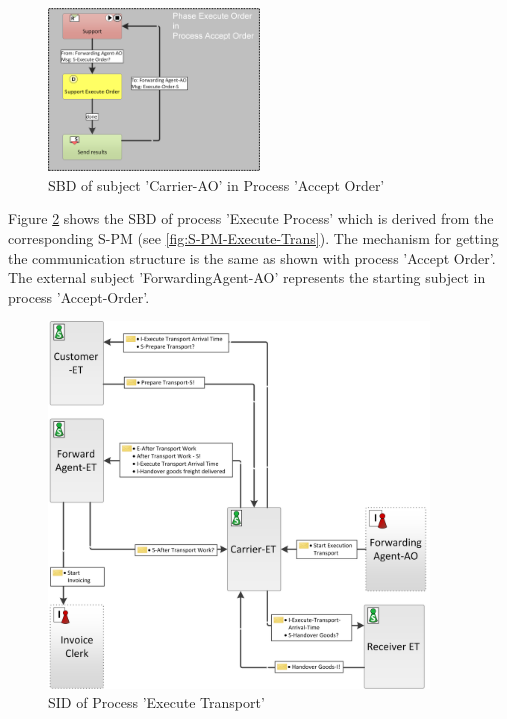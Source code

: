 \begin{figure}[hbtp]
    \begin{center}
        
	\includegraphics[width=0.5\textwidth]{Figures/Chapter5/Subject-Phase/CarrierAO_NEW.png}
	\caption{SBD of subject 'Carrier-AO' in Process 'Accept Order'}
	\label{fig:CarrierAO}
\end{center}
\end{figure}

Figure \ref{fig:SCD-ExecuteTransport} shows the SBD of process 'Execute Process' which is derived from the corresponding S-PM (see \ref{fig:S-PM-Execute-Trans}). The mechanism for getting the communication structure is the same as shown with process 'Accept Order'. The external subject 'ForwardingAgent-AO' represents the starting subject in process 'Accept-Order'.


\begin{figure}[hbtp]
	\includegraphics[width=0.9\textwidth]{Figures/Chapter5/Subject-Phase/SCD-ExecuteTransport_NEW.png}
	\caption{SID of Process 'Execute Transport'}
	\label{fig:SCD-ExecuteTransport}
\end{figure}

